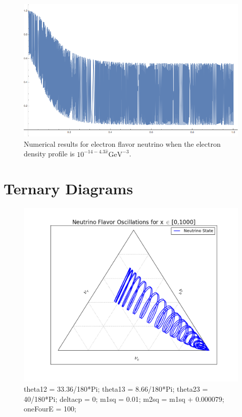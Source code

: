 \documentclass{tufte-handout}
\begin{document}
\begin{figure}
\centering
\includegraphics{assets/numMSW-model-1}
\caption{Numerical results for electron flavor neutrino when the electron density profile is $10^{-14 - 4.3\hat x} \mathrm{GeV}^{-3}$.}
\label{fig:numMSW-model-1}
\end{figure}














\section{Ternary Diagrams}



\begin{figure}
\centering
\includegraphics{assets/ternary/1000-1}
\caption{ 
theta12 = 33.36/180*Pi;\newline
theta13 = 8.66/180*Pi;\newline
theta23 = 40/180*Pi;\newline
deltacp = 0;\newline
m1sq = 0.01;\newline
m2sq = m1sq + 0.000079;\newline
oneFourE = 100; 
}
\end{figure}
\end{document}
